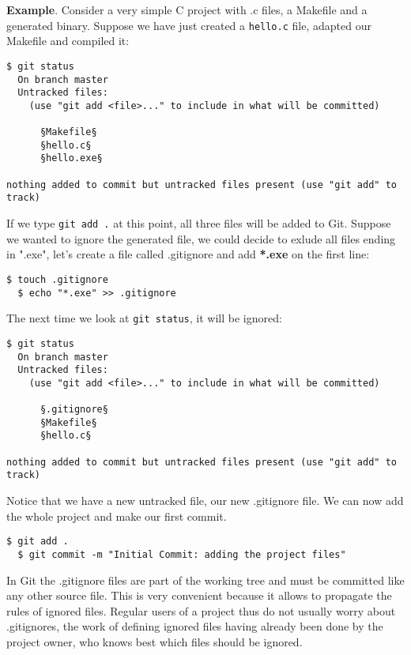 \documentclass[a4paper]{../../common/tufte-latex/tufte-handout}
\begin{document}
\noindent \textbf{Example}.
Consider a very simple C project with .c files, a Makefile and a generated binary.
Suppose we have just created a \texttt{hello.c} file, adapted our Makefile and compiled it:

\begin{lstlisting}[style=BashInputStyle]
  $ git status
  On branch master
  Untracked files:
    (use "git add <file>..." to include in what will be committed)
  
      §Makefile§
      §hello.c§
      §hello.exe§

nothing added to commit but untracked files present (use "git add" to track)
\end{lstlisting}

If we type \texttt{git add .} at this point, all three files will be added to Git.
Suppose we wanted to ignore the generated file, we could decide to exlude all files ending in ".exe", let's create a file called .gitignore and add \textbf{*.exe} on the first line:
\begin{lstlisting}[style=BashInputStyle]
  $ touch .gitignore
  $ echo "*.exe" >> .gitignore
\end{lstlisting}

The next time we look at \texttt{git status}, it will be ignored:
\begin{lstlisting}[style=BashInputStyle]
  $ git status
  On branch master
  Untracked files:
    (use "git add <file>..." to include in what will be committed)
  
      §.gitignore§
      §Makefile§
      §hello.c§

nothing added to commit but untracked files present (use "git add" to track)
\end{lstlisting}

Notice that we have a new untracked file, our new .gitignore file.
We can now add the whole project and make our first commit.

\begin{lstlisting}[style=BashInputStyle]
  $ git add .
  $ git commit -m "Initial Commit: adding the project files"
\end{lstlisting}

In Git the .gitignore files are part of the working tree and must be committed like any other source file.
This is very convenient because it allows to propagate the rules of ignored files.
Regular users of a project thus do not usually worry about .gitignores, the work of defining ignored files having already been done by the project owner, who knows best which files should be ignored.
\end{document}
